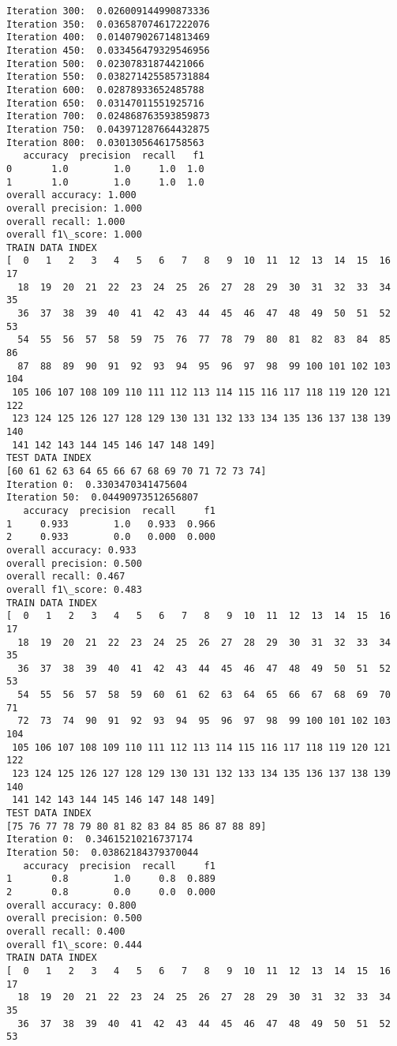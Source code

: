 \documentclass[11pt]{article}
\begin{document}
\begin{Verbatim}[commandchars=\\\{\}]
Iteration 300:  0.026009144990873336
Iteration 350:  0.036587074617222076
Iteration 400:  0.014079026714813469
Iteration 450:  0.033456479329546956
Iteration 500:  0.02307831874421066
Iteration 550:  0.038271425585731884
Iteration 600:  0.02878933652485788
Iteration 650:  0.03147011551925716
Iteration 700:  0.024868763593859873
Iteration 750:  0.043971287664432875
Iteration 800:  0.03013056461758563
   accuracy  precision  recall   f1
0       1.0        1.0     1.0  1.0
1       1.0        1.0     1.0  1.0
overall accuracy: 1.000
overall precision: 1.000
overall recall: 1.000
overall f1\_score: 1.000
TRAIN DATA INDEX
[  0   1   2   3   4   5   6   7   8   9  10  11  12  13  14  15  16  17
  18  19  20  21  22  23  24  25  26  27  28  29  30  31  32  33  34  35
  36  37  38  39  40  41  42  43  44  45  46  47  48  49  50  51  52  53
  54  55  56  57  58  59  75  76  77  78  79  80  81  82  83  84  85  86
  87  88  89  90  91  92  93  94  95  96  97  98  99 100 101 102 103 104
 105 106 107 108 109 110 111 112 113 114 115 116 117 118 119 120 121 122
 123 124 125 126 127 128 129 130 131 132 133 134 135 136 137 138 139 140
 141 142 143 144 145 146 147 148 149]
TEST DATA INDEX
[60 61 62 63 64 65 66 67 68 69 70 71 72 73 74]
Iteration 0:  0.3303470341475604
Iteration 50:  0.04490973512656807
   accuracy  precision  recall     f1
1     0.933        1.0   0.933  0.966
2     0.933        0.0   0.000  0.000
overall accuracy: 0.933
overall precision: 0.500
overall recall: 0.467
overall f1\_score: 0.483
TRAIN DATA INDEX
[  0   1   2   3   4   5   6   7   8   9  10  11  12  13  14  15  16  17
  18  19  20  21  22  23  24  25  26  27  28  29  30  31  32  33  34  35
  36  37  38  39  40  41  42  43  44  45  46  47  48  49  50  51  52  53
  54  55  56  57  58  59  60  61  62  63  64  65  66  67  68  69  70  71
  72  73  74  90  91  92  93  94  95  96  97  98  99 100 101 102 103 104
 105 106 107 108 109 110 111 112 113 114 115 116 117 118 119 120 121 122
 123 124 125 126 127 128 129 130 131 132 133 134 135 136 137 138 139 140
 141 142 143 144 145 146 147 148 149]
TEST DATA INDEX
[75 76 77 78 79 80 81 82 83 84 85 86 87 88 89]
Iteration 0:  0.34615210216737174
Iteration 50:  0.03862184379370044
   accuracy  precision  recall     f1
1       0.8        1.0     0.8  0.889
2       0.8        0.0     0.0  0.000
overall accuracy: 0.800
overall precision: 0.500
overall recall: 0.400
overall f1\_score: 0.444
TRAIN DATA INDEX
[  0   1   2   3   4   5   6   7   8   9  10  11  12  13  14  15  16  17
  18  19  20  21  22  23  24  25  26  27  28  29  30  31  32  33  34  35
  36  37  38  39  40  41  42  43  44  45  46  47  48  49  50  51  52  53

\end{Verbatim}
\end{document}

